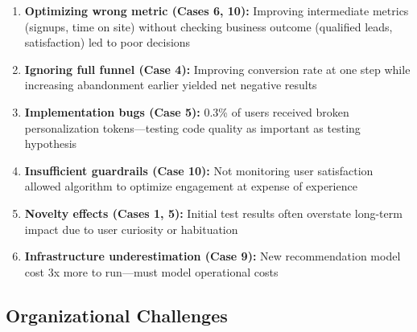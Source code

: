 \begin{enumerate}
    \item \textbf{Optimizing wrong metric (Cases 6, 10):} Improving intermediate metrics (signups, time on site) without checking business outcome (qualified leads, satisfaction) led to poor decisions

    \item \textbf{Ignoring full funnel (Case 4):} Improving conversion rate at one step while increasing abandonment earlier yielded net negative results

    \item \textbf{Implementation bugs (Case 5):} 0.3\% of users received broken personalization tokens—testing code quality as important as testing hypothesis

    \item \textbf{Insufficient guardrails (Case 10):} Not monitoring user satisfaction allowed algorithm to optimize engagement at expense of experience

    \item \textbf{Novelty effects (Cases 1, 5):} Initial test results often overstate long-term impact due to user curiosity or habituation

    \item \textbf{Infrastructure underestimation (Case 9):} New recommendation model cost 3x more to run—must model operational costs
\end{enumerate}

\subsection{Organizational Challenges}

